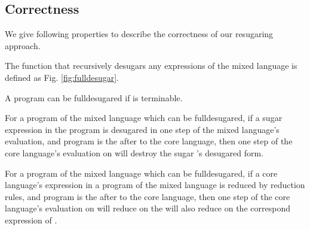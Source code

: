 \subsection{Correctness}
\label{mark:correct}

We give following properties to describe the correctness of our resugaring approach.
\begin{Def}[fulldesugar] The function that recursively desugars any expressions of the mixed language is defined as Fig.  \ref{fig:fulldesugar}.\end{Def}

A program  can be fulldesugared  if  is terminable.



\begin{mythm} \label{thm1} For a program of the mixed language  which can be fulldesugared, if a sugar expression  in the program  is desugared in one step of the mixed language's evaluation, and program  is the  after  to the core language, then one step of the core language's evaluation on  will destroy the sugar 's desugared form.
\end{mythm}

\begin{mythm} \label{thm2} For a program of the mixed language  which can be fulldesugared, if a core language's expression  in a program  of the mixed language is reduced by reduction rules, and program  is the  after  to the core language, then one step of the core language's evaluation on  will reduce on the  will also reduce on the correspond expression of .
\end{mythm}

